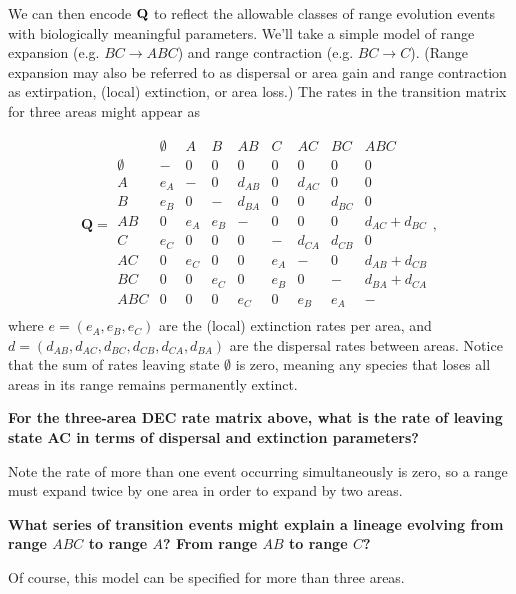 We can then encode ${\bf Q}$ to reflect the allowable classes of range evolution events with biologically meaningful parameters.
We'll take a simple model of range expansion (e.g. $BC \rightarrow ABC$) and range contraction (e.g. $BC \rightarrow C$).
(Range expansion may also be referred to as dispersal or area gain and range contraction as extirpation, (local) extinction, or area loss.)
The rates in the transition matrix for three areas might appear as

\[
\textbf{Q} = 
	\begin{array}{c|cccccccc}
		& \emptyset & A & B & AB & C & AC & BC & ABC \\
		\hline
		\emptyset 	& - 	& 0 	& 0 	& 0 		& 0			& 0 		& 0 		& 0 \\
		A 			& e_A 	& - 	& 0 	& d_{AB} 	& 0			& d_{AC} 	& 0 		& 0 \\
		B 			& e_B 	& 0 	& - 	& d_{BA}	& 0			& 0 		& d_{BC} 	& 0 \\
		AB 			& 0 	& e_A 	& e_B 	& - 		& 0			& 0 		& 0 		& d_{AC} + d_{BC} \\
		C 			& e_C 	& 0 	& 0 	& 0 		& - 		& d_{CA} 	& d_{CB} 	& 0 \\
		AC 			& 0 	& e_C 	& 0 	& 0 		& e_A		& - 		& 0 		& d_{AB} + d_{CB} \\
		BC 			& 0 	& 0 	& e_C 	& 0 		& e_B		& 0 		& - 		& d_{BA} + d_{CA} \\
		ABC 		& 0 	& 0 	& 0 	& e_C 		& 0 		& e_B 		& e_A 		& - \\								
	\end{array},
\]
where $e = ( e_A, e_B, e_C )$ are the (local) extinction rates per area, and $d = ( d_{AB}, d_{AC}, d_{BC}, d_{CB}, d_{CA}, d_{BA})$ are the dispersal rates between areas.
Notice that the sum of rates leaving state $\emptyset$ is zero, meaning any species that loses all areas in its range remains permanently extinct.


{\bf {} For the three-area DEC rate matrix above, what is the rate of leaving state AC in terms of dispersal and extinction parameters?}

Note the rate of more than one event occurring simultaneously is zero, so a range must expand twice by one area in order to expand by two areas.

{\bf {} What series of transition events might explain a lineage evolving from range $ABC$ to range $A$? From range $AB$ to range $C$?}

Of course, this model can be specified for more than three areas.

